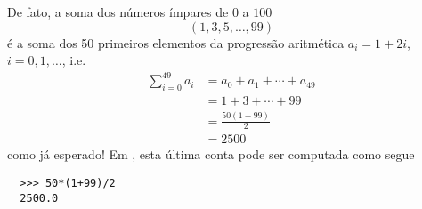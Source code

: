 De fato, a soma dos números ímpares de $0$ a $100$
\begin{equation}
  (1, 3, 5, \dotsc, 99)
\end{equation}
é a soma dos 50 primeiros elementos da progressão aritmética $a_i = 1 + 2i$, $i=0, 1, \ldots$, i.e.
\begin{align}
  \sum_{i=0}^{49}a_i &= a_0 + a_1 + \cdots + a_{49}\\
                     &= 1 + 3 + \cdots + 99\\
                     &= \frac{50(1 + 99)}{2}\\
                     &= 2500
\end{align}
como já esperado! Em {\python}, esta última conta pode ser computada como segue
\begin{lstlisting}
  >>> 50*(1+99)/2
  2500.0
\end{lstlisting}
